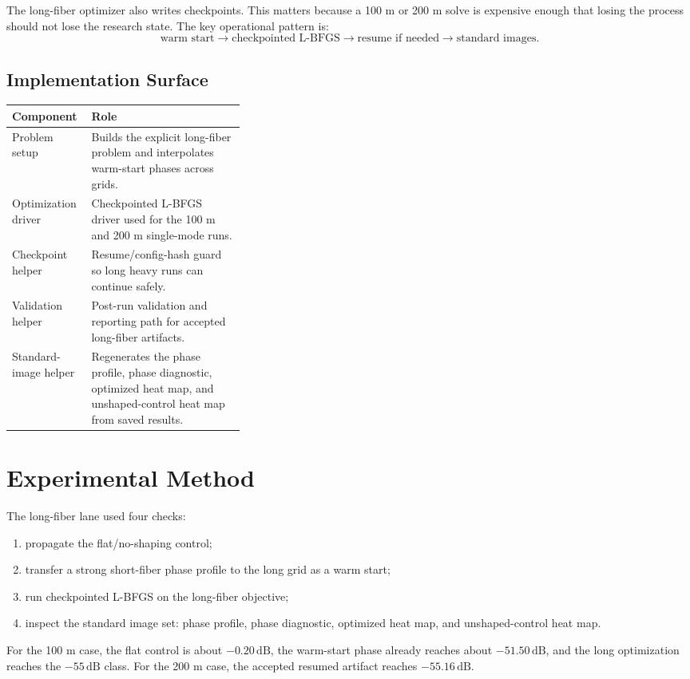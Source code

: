 \documentclass[11pt]{article}
\begin{document}
The long-fiber optimizer also writes checkpoints. This matters because a 100 m
or 200 m solve is expensive enough that losing the process should not lose the
research state. The key operational pattern is:
\[
    \text{warm start} \rightarrow \text{checkpointed L-BFGS}
    \rightarrow \text{resume if needed} \rightarrow \text{standard images}.
\]

\subsection*{Implementation Surface}
\begin{tabularx}{\linewidth}{@{}p{0.34\linewidth}X@{}}
\toprule
\textbf{Component} & \textbf{Role} \\
\midrule
Problem setup & Builds the explicit long-fiber problem and interpolates warm-start phases across grids. \\
Optimization driver & Checkpointed L-BFGS driver used for the 100 m and 200 m single-mode runs. \\
Checkpoint helper & Resume/config-hash guard so long heavy runs can continue safely. \\
Validation helper & Post-run validation and reporting path for accepted long-fiber artifacts. \\
Standard-image helper & Regenerates the phase profile, phase diagnostic, optimized heat map, and unshaped-control heat map from saved results. \\
\bottomrule
\end{tabularx}

\section{Experimental Method}

The long-fiber lane used four checks:
\begin{enumerate}
    \item propagate the flat/no-shaping control;
    \item transfer a strong short-fiber phase profile to the long grid as a warm start;
    \item run checkpointed L-BFGS on the long-fiber objective;
    \item inspect the standard image set: phase profile, phase diagnostic,
    optimized heat map, and unshaped-control heat map.
\end{enumerate}

For the 100 m case, the flat control is about \(-0.20\,\mathrm{dB}\), the
warm-start phase already reaches about \(-51.50\,\mathrm{dB}\), and the long
optimization reaches the \(-55\,\mathrm{dB}\) class. For the 200 m case, the
accepted resumed artifact reaches \(-55.16\,\mathrm{dB}\).
\end{document}
